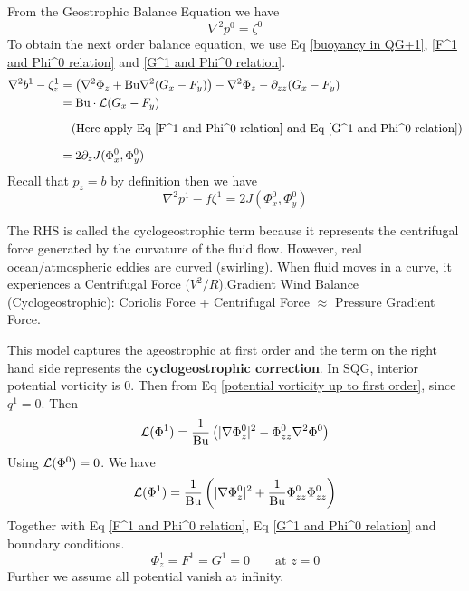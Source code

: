 \documentclass[../SQG_notes.tex]{subfiles}
\begin{document}
From the Geostrophic Balance Equation we have 
\[ \nabla^2 p^0 = \zeta^0\]
To obtain the next order balance equation, we use Eq \ref{buoyancy in QG+1}, \ref{F^1 and Phi^0 relation} and \ref{G^1 and Phi^0 relation}.
\begin{equation}
    \begin{aligned}
        \nabla^2 b^1 - \zeta_z^1 &= \left( \nabla^2 \Phi_z + \text{Bu}\nabla^2(G_x - F_y)\right) - \nabla^2\Phi_z - \partial_{zz}(G_x - F_y) \\
        &= \text{Bu} \cdot \mathcal{L}(G_x - F_y) \\[1.5ex]
        &\quad \text{(Here apply Eq \ref{F^1 and Phi^0 relation} and Eq \ref{G^1 and Phi^0 relation})}  \\[1.5ex]
        &= 2\partial_z J(\Phi_x^0, \Phi_y^0)
    \end{aligned}
\end{equation}
Recall that $p_z = b$ by definition then we have 
\begin{equation}
    \boxed{\nabla^2 p^1 - f\zeta^1 = 2J(\Phi_x^0, \Phi_y^0)} \label{cyclogeostrophic correction}
\end{equation}
\begin{explanation}
    The RHS is called the cyclogeostrophic term because it represents the centrifugal force generated by the curvature of the fluid flow. However, real ocean/atmospheric eddies are curved (swirling). When fluid moves in a curve, it experiences a Centrifugal Force ($V^2/R$).Gradient Wind Balance (Cyclogeostrophic): Coriolis Force + Centrifugal Force $\approx$ Pressure Gradient Force.
\end{explanation}
This model captures the ageostrophic at first order and the term on the right hand side represents the \textbf{cyclogeostrophic correction}. In SQG, interior potential vorticity is $0$. Then from Eq \ref{potential vorticity up to first order}, since $q^1 = 0$. Then 
\[
    \mathcal{L}(\Phi^1) = \frac{1}{\text{Bu}} \left( |\nabla\Phi_z^0|^2 - \Phi_{zz}^0 \nabla^2 \Phi^0 \right)
\]
Using $\mathcal{L}(\Phi^0)= 0$. We have 
\begin{equation}
    \mathcal{L}(\Phi^1) = \frac{1}{\text{Bu}} \left(|\nabla \Phi^0_z|^2 + \frac{1}{\text{Bu}}\Phi_{zz}^0\Phi_{zz}^0\right) \label{main equation for Phi^1}
\end{equation}
Together with Eq \ref{F^1 and Phi^0 relation}, Eq \ref{G^1 and Phi^0 relation} and boundary conditions. 
\[ \Phi_z^1 = F^1 = G^1 = 0 \qquad \text{at } z = 0\]
Further we assume all potential vanish at infinity.
\end{document}
